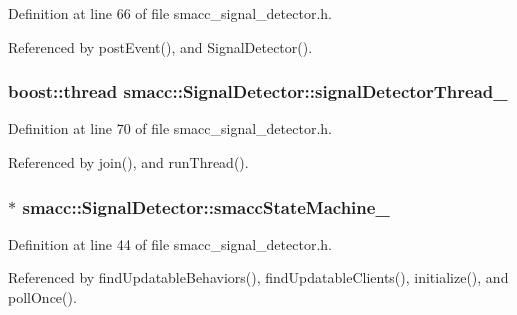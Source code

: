 Definition at line 66 of file smacc\+\_\+signal\+\_\+detector.\+h.



Referenced by post\+Event(), and Signal\+Detector().

\subsubsection[{\texorpdfstring{signal\+Detector\+Thread\+\_\+}{signalDetectorThread_}}]{\setlength{\rightskip}{0pt plus 5cm}boost\+::thread smacc\+::\+Signal\+Detector\+::signal\+Detector\+Thread\+\_\+\hspace{0.3cm}{\ttfamily [private]}}\hypertarget{classsmacc_1_1SignalDetector_a4346a400cd37eafc5d1d2e63d975785e}{}\label{classsmacc_1_1SignalDetector_a4346a400cd37eafc5d1d2e63d975785e}


Definition at line 70 of file smacc\+\_\+signal\+\_\+detector.\+h.



Referenced by join(), and run\+Thread().

\subsubsection[{\texorpdfstring{smacc\+State\+Machine\+\_\+}{smaccStateMachine_}}]{$\ast$ smacc\+::\+Signal\+Detector\+::smacc\+State\+Machine\+\_\+\hspace{0.3cm}{\ttfamily [private]}}\hypertarget{classsmacc_1_1SignalDetector_a46025de6ac7b5980e22144f9703236a4}{}\label{classsmacc_1_1SignalDetector_a46025de6ac7b5980e22144f9703236a4}


Definition at line 44 of file smacc\+\_\+signal\+\_\+detector.\+h.



Referenced by find\+Updatable\+Behaviors(), find\+Updatable\+Clients(), initialize(), and poll\+Once().

